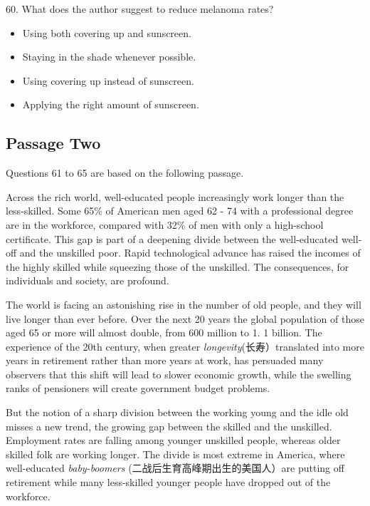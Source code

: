 \documentclass[UTF8,11pt]{ctexart}
\begin{document}
60. What does the author suggest to reduce melanoma rates?


\begin{itemize}[leftmargin=2em,itemsep=.2em,topsep=.4em]\item[A.] Using both covering up and sunscreen.
\item[B.] Staying in the shade whenever possible.
\item[C.] Using covering up instead of sunscreen.
\item[D.] Applying the right amount of sunscreen.
\end{itemize}

\subsection*{\textbf{Passage Two}}


Questions 61 to 65 are based on the following passage.


Across the rich world, well-educated people increasingly work longer than the less-skilled. Some 65\% of American men aged 62 - 74 with a professional degree are in the workforce, compared with 32\% of men with only a high-school certificate. This gap is part of a deepening divide between the well-educated well-off and the unskilled poor. Rapid technological advance has raised the incomes of the highly skilled while squeezing those of the unskilled. The consequences, for individuals and society, are profound.


The world is facing an astonishing rise in the number of old people, and they will live longer than ever before. Over the next 20 years the global population of those aged 65 or more will almost double, from 600 million to 1. 1 billion. The experience of the 20th century, when greater\textit{ longevity}(长寿）translated into more years in retirement rather than more years at work, has persuaded many observers that this shift will lead to slower economic growth, while the swelling ranks of pensioners will create government budget problems.


But the notion of a sharp division between the working young and the idle old misses a new trend, the growing gap between the skilled and the unskilled. Employment rates are falling among younger unskilled people, whereas older skilled folk are working longer. The divide is most extreme in America, where well-educated\textit{ baby-boomers} (二战后生育高峰期出生的美国人）are putting off retirement while many less-skilled younger people have dropped out of the workforce.
\end{document}
